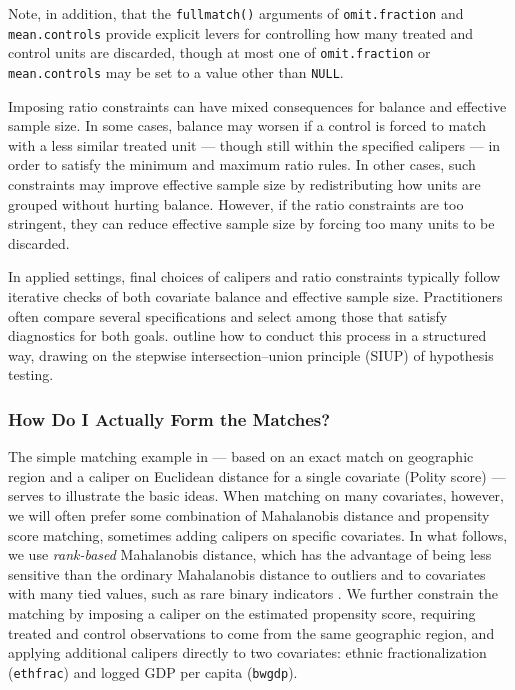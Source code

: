 \documentclass[twoside,11pt]{article}
\begin{document}
Note, in addition, that the \texttt{fullmatch()} arguments of
\texttt{omit.fraction} and \texttt{mean.controls} provide explicit
levers for controlling how many treated and control units are discarded,
though at most one of \texttt{omit.fraction} or \texttt{mean.controls} may be set to a value other than \texttt{NULL}.

Imposing ratio constraints can have mixed consequences for balance and
effective sample size. In some cases,
balance may worsen if a control is forced to match with a less similar
treated unit --- though still within the specified calipers --- in order
to satisfy the minimum and maximum ratio rules. In other cases, such
constraints may improve effective sample size by redistributing how
units are grouped without hurting balance. However, if the ratio
constraints are too stringent, they can reduce effective sample size by
forcing too many units to be discarded.

In applied settings, final choices of calipers and ratio constraints
typically follow iterative checks of both covariate balance and
effective sample size. Practitioners often compare several
specifications and select among those that satisfy diagnostics for both
goals. \citet{hansensales2015} outline how to conduct this process
in a structured way, drawing on the stepwise intersection--union
principle (SIUP) of hypothesis testing.

\subsubsection{How Do I Actually Form the
Matches?}\label{how-do-i-actually-form-the-matches}

The simple matching example in  --- based on an exact match on
geographic region and a caliper on Euclidean distance for a single
covariate (Polity score) --- serves to illustrate the basic ideas. When
matching on many covariates, however, we will often prefer some
combination of Mahalanobis distance and propensity score matching,
sometimes adding calipers on specific covariates. In what follows, we
use \emph{rank-based} Mahalanobis distance, which has the advantage of
being less sensitive than the ordinary Mahalanobis distance to outliers and to covariates with many tied values, such as
rare binary indicators \citep[pp.~171--172]{rosenbaum2010}. We further constrain the matching by
imposing a caliper on the estimated propensity score, requiring treated
and control observations to come from the same geographic region, and
applying additional calipers directly to two covariates: ethnic
fractionalization (\texttt{ethfrac}) and logged GDP per capita
(\texttt{bwgdp}).
\end{document}
